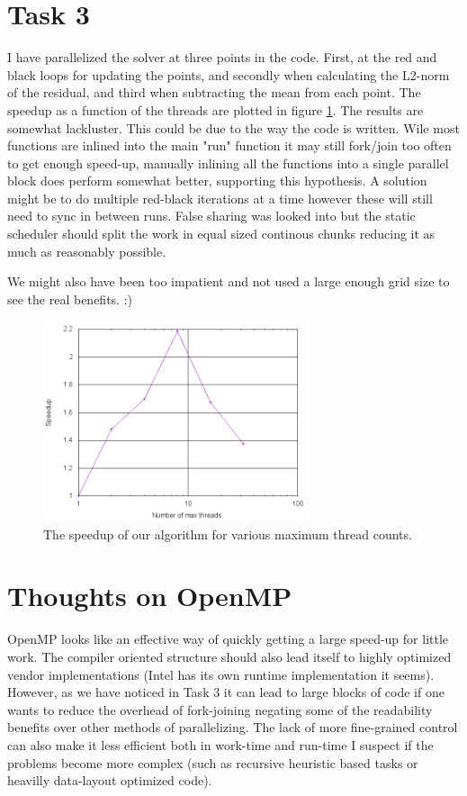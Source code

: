 \section{Task 3}
I have parallelized the solver at three points in the code. First, at the red and black loops for updating the points, and secondly when calculating the L2-norm of the residual, and third when
subtracting the mean from each point.
 The speedup as a function of the threads are plotted in figure \ref{fig:threads}.
 The results are somewhat lackluster. This could be due to the way the code is written.
  Wile most functions are inlined into the main "run" function it may still fork/join too
  often to get enough speed-up, manually inlining all the functions into a single parallel block does perform somewhat better, supporting this hypothesis. A solution might be to do multiple red-black iterations at a time
however these will still need to sync in between runs. False sharing was looked into but the static scheduler should split the work in equal sized continous chunks reducing it as much as reasonably possible.
\par We might also have been too impatient and not used a large enough grid size to see the real benefits. :)
\begin{figure}[h!]
  \centering
    \includegraphics[width=0.7\textwidth]{plots/threading_speedup.png}
  \caption{The speedup of our algorithm for various maximum thread counts.}
  \label{fig:threads}
\end{figure}

\section{Thoughts on OpenMP}
OpenMP looks like an effective way of quickly getting a large speed-up for little work. The compiler oriented structure should also lead itself to highly optimized vendor implementations (Intel has its own runtime implementation it seems).
However, as we have noticed in Task 3 it can lead to large blocks of code if one wants to reduce the overhead of fork-joining negating some of the readability benefits over other methods of parallelizing.
The lack of more fine-grained control can also make it less efficient both in work-time and run-time I suspect if the problems become more complex (such as recursive heuristic based tasks or heavilly data-layout optimized code).

